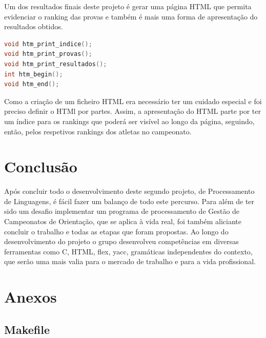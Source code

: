 \documentclass[11pt, a4paper, oneside]{article}
\begin{document}
Um dos resultados finais deste projeto é gerar uma página HTML que permita evidenciar o ranking das provas e também é mais uma forma de apresentação do resultados obtidos.

\begin{lstlisting}[language=C, caption={Assinatura das funções.}]
void htm_print_indice();
void htm_print_provas();
void htm_print_resultados();
int htm_begin();
void htm_end();
\end{lstlisting}

Como a criação de um ficheiro HTML era necessário ter um cuidado especial e foi preciso definir o HTMl por partes.
Assim, a apresentação do HTML parte por ter um índice para os rankings que poderá ser visível ao longo da página, seguindo, então, pelos respetivos rankings dos atletas no campeonato.

\newpage
\section{Conclusão}

Após concluir todo o desenvolvimento deste segundo projeto, de Processamento de Linguagens, é fácil fazer um balanço de todo este percurso. Para além de ter sido um desafio implementar um programa de processamento de Gestão de Campeonatos de Orientação, que se aplica à vida real, foi também aliciante concluir o trabalho e todas as etapas que foram propostas.
Ao longo do desenvolvimento do projeto o grupo desenvolveu competências em diversas ferramentas como \textsf{C}, HTML, \textsf{flex}, \textsf{yacc}, gramáticas independentes do contexto, que serão uma mais valia para o mercado de trabalho e para a vida profissional. 


\newpage
\section{Anexos}

\subsection{Makefile}
\end{document}
